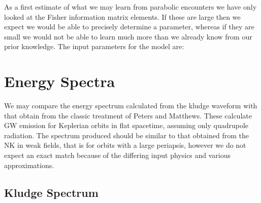 \documentclass[a4paper, 11pt, titlepage, twoside]{report}
\begin{document}
As a first estimate of what we may learn from parabolic encounters we have only looked at the Fisher information matrix elements. If these are large then we expect we would be able to precisely determine a parameter, whereas if they are small we would not be able to learn much more than we already know from our prior knowledge. The input parameters for the model are:

\section{Energy Spectra}

We may compare the energy spectrum calculated from the kludge waveform with that obtain from the classic treatment of Peters and Matthews\cite{Peters1963, Peters1964}. These calculate GW emission for Keplerian orbits in flat spacetime, assuming only quadrupole radiation. The spectrum produced should be similar to that obtained from the NK in weak fields, that is for orbits with a large periapsis, however we do not expect an exact match because of the differing input physics and various approximations.

\subsection{Kludge Spectrum}
\end{document}
